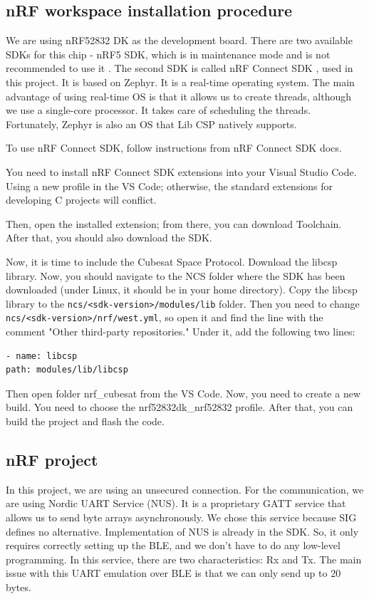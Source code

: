 \documentclass[conference]{IEEEtran}
\begin{document}
\subsection{nRF workspace installation procedure}
We are using nRF52832 DK as the development board. There are two available SDKs for this chip - nRF5 SDK, which is in maintenance mode and is not recommended to use it \cite{sdk}. The second SDK is called nRF Connect SDK \cite{connect}, used in this project. It is based on Zephyr. It is a real-time operating system. The main advantage of using real-time OS is that it allows us to create threads, although we use a single-core processor. It takes care of scheduling the threads. Fortunately, Zephyr is also an OS that Lib CSP natively supports.

To use nRF Connect SDK, follow instructions from nRF Connect SDK docs.

You need to install nRF Connect SDK extensions into your Visual Studio Code. Using a new profile in the VS Code; otherwise, the standard extensions for developing C projects will conflict.

Then, open the installed extension; from there, you can download Toolchain. After that, you should also download the SDK.

Now, it is time to include the Cubesat Space Protocol. Download the libcsp library. Now, you should navigate to the NCS folder where the SDK has been downloaded (under Linux, it should be in your home directory). Copy the libcsp library to the \lstinline{ncs/<sdk-version>/modules/lib} folder. Then you need to change \lstinline{ncs/<sdk-version>/nrf/west.yml}, so open it and find the line with the comment "Other third-party repositories." Under it, add the following two lines:
\begin{verbatim}
- name: libcsp
path: modules/lib/libcsp
\end{verbatim}

Then open folder nrf\_cubesat from the VS Code. Now, you need to create a new build. You need to choose the nrf52832dk\_nrf52832 profile. After that, you can build the project and flash the code.

\subsection{nRF project}
In this project, we are using an unsecured connection. For the communication, we are using Nordic UART Service (NUS). It is a proprietary GATT service that allows us to send byte arrays asynchronously. We chose this service because SIG defines no alternative. Implementation of NUS is already in the SDK. So, it only requires correctly setting up the BLE, and we don't have to do any low-level programming. In this service, there are two characteristics: Rx and Tx. The main issue with this UART emulation over BLE is that we can only send up to 20 bytes.
\end{document}
